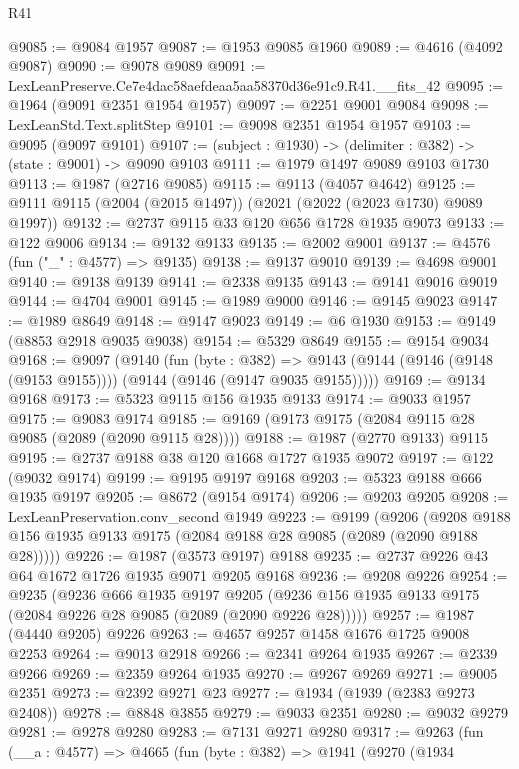 \begin{lexlean}{R41}
\begin{coremodule}
@9085 := @9084 @1957
@9087 := @1953 @9085 @1960
@9089 := @4616 (@4092 @9087)
@9090 := @9078 @9089
@9091 := LexLeanPreserve.Ce7e4dac58aefdeaa5aa58370d36e91c9.R41.__fits_42
@9095 := @1964 (@9091 @2351 @1954 @1957)
@9097 := @2251 @9001 @9084
@9098 := LexLeanStd.Text.splitStep
@9101 := @9098 @2351 @1954 @1957
@9103 := @9095 (@9097 @9101)
@9107 := (subject : @1930) -> (delimiter : @382) -> (state : @9001) -> @9090 @9103
@9111 := @1979 @1497 @9089 @9103 @1730
@9113 := @1987 (@2716 @9085)
@9115 := @9113 (@4057 @4642)
@9125 := @9111 @9115 (@2004 (@2015 @1497)) (@2021 (@2022 (@2023 @1730) @9089 @1997))
@9132 := @2737 @9115 @33 @120 @656 @1728 @1935 @9073
@9133 := @122 @9006
@9134 := @9132 @9133
@9135 := @2002 @9001
@9137 := @4576 (fun ("_" : @4577) => @9135)
@9138 := @9137 @9010
@9139 := @4698 @9001
@9140 := @9138 @9139
@9141 := @2338 @9135
@9143 := @9141 @9016 @9019
@9144 := @4704 @9001
@9145 := @1989 @9000
@9146 := @9145 @9023
@9147 := @1989 @8649
@9148 := @9147 @9023
@9149 := @6 @1930
@9153 := @9149 (@8853 @2918 @9035 @9038)
@9154 := @5329 @8649
@9155 := @9154 @9034
@9168 := @9097
    (@9140
      (fun (byte : @382) =>
      @9143 (@9144 (@9146 (@9148 (@9153 @9155)))) (@9144 (@9146 (@9147 @9035 @9155)))))
@9169 := @9134 @9168
@9173 := @5323 @9115 @156 @1935 @9133
@9174 := @9033 @1957
@9175 := @9083 @9174
@9185 := @9169 (@9173 @9175 (@2084 @9115 @28 @9085 (@2089 (@2090 @9115 @28))))
@9188 := @1987 (@2770 @9133) @9115
@9195 := @2737 @9188 @38 @120 @1668 @1727 @1935 @9072
@9197 := @122 (@9032 @9174)
@9199 := @9195 @9197 @9168
@9203 := @5323 @9188 @666 @1935 @9197
@9205 := @8672 (@9154 @9174)
@9206 := @9203 @9205
@9208 := LexLeanPreservation.conv_second @1949
@9223 := @9199
    (@9206 (@9208 @9188 @156 @1935 @9133 @9175 (@2084 @9188 @28 @9085 (@2089 (@2090 @9188 @28)))))
@9226 := @1987 (@3573 @9197) @9188
@9235 := @2737 @9226 @43 @64 @1672 @1726 @1935 @9071 @9205 @9168
@9236 := @9208 @9226
@9254 := @9235
    (@9236
      @666
      @1935
      @9197
      @9205
      (@9236 @156 @1935 @9133 @9175 (@2084 @9226 @28 @9085 (@2089 (@2090 @9226 @28)))))
@9257 := @1987 (@4440 @9205) @9226
@9263 := @4657 @9257 @1458 @1676 @1725 @9008 @2253
@9264 := @9013 @2918
@9266 := @2341 @9264 @1935
@9267 := @2339 @9266
@9269 := @2359 @9264 @1935
@9270 := @9267 @9269
@9271 := @9005 @2351
@9273 := @2392 @9271 @23
@9277 := @1934 (@1939 (@2383 @9273 @2408))
@9278 := @8848 @3855
@9279 := @9033 @2351
@9280 := @9032 @9279
@9281 := @9278 @9280
@9283 := @7131 @9271 @9280
@9317 := @9263
    (fun (__a : @4577) =>
    @4665
      (fun (byte : @382) =>
      @1941
        (@9270
          (@1934

\end{coremodule}
\end{lexlean}
